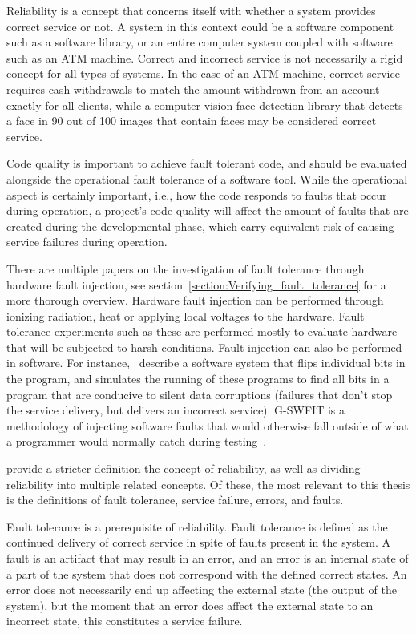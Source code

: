 Reliability is a concept that concerns itself with whether a system provides correct service or not. A system in this context could be a software component such as a software library, or an entire computer system coupled with software such as an ATM machine. Correct and incorrect service is not necessarily a rigid concept for all types of systems. In the case of an ATM machine, correct service requires cash withdrawals to match the amount withdrawn from an account exactly for all clients, while a computer vision face detection library that detects a face in 90 out of 100 images that contain faces may be considered correct service.


Code quality is important to achieve fault tolerant code, and should be evaluated alongside the operational fault tolerance of a software tool. While the operational aspect is certainly important, i.e., how the code responds to faults that occur during operation, a project's code quality will affect the amount of faults that are created during the developmental phase, which carry equivalent risk of causing service failures during operation. 

There are multiple papers on the investigation of fault tolerance through hardware fault injection, see section~\ref{section:Verifying_fault_tolerance} for a more thorough overview. Hardware fault injection can be performed through ionizing radiation, heat or applying local voltages to the hardware. Fault tolerance experiments such as these are performed mostly to evaluate hardware that will be subjected to harsh conditions. 
Fault injection can also be performed in software. For instance,~\citet{venkatagiri2019gem5} describe a software system that flips individual bits in the program, and simulates the running of these programs to find all bits in a program that are conducive to silent data corruptions (failures that don't stop the service delivery, but delivers an incorrect service).  G-SWFIT is a methodology of injecting software faults that would otherwise fall outside of what a programmer would normally catch during testing~\citep{natella2012fault}.



\citet{avizienis2004basic} provide a stricter definition the concept of reliability, as well as dividing reliability into multiple related concepts. Of these, the most relevant to this thesis is the definitions of fault tolerance, service failure, errors, and faults.  

Fault tolerance is a prerequisite of reliability. Fault tolerance is defined as the continued delivery of correct service in spite of faults present in the system. A fault is an artifact that may result in an error, and an error is an internal state of a part of the system that does not correspond with the defined correct states. An error does not necessarily end up affecting the external state (the output of the system), but the moment that an error does affect the external state to an incorrect state, this constitutes a service failure.

